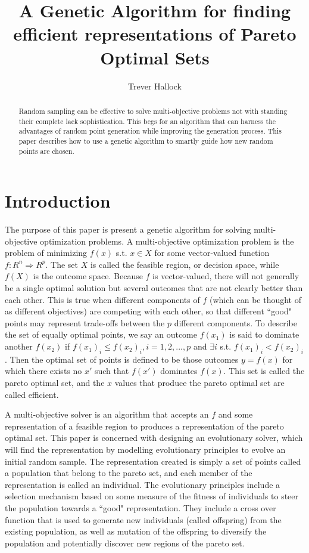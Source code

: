 \documentclass{article}
\author{Trever Hallock}
\title{A Genetic Algorithm for finding efficient representations of Pareto Optimal Sets}
\begin{document}
\maketitle


\begin{abstract}
Random sampling can be effective to solve multi-objective problems not with standing their complete lack sophistication.
This begs for an algorithm that can harness the advantages of random point generation while improving the generation process.
This paper describes how to use a genetic algorithm to smartly guide how new random points are chosen.
\end{abstract}

\pagebreak


\section{Introduction}

The purpose of this paper is present a genetic algorithm for solving multi-objective optimization problems.
A multi-objective optimization problem is the problem of minimizing $f(x)$ s.t. $x \in X$ for some vector-valued function $f:R^n \Rightarrow R^p$.
The set $X$ is called the feasible region, or decision space, while $f(X)$ is the outcome space.
Because $f$ is vector-valued, there will not generally be a single optimal solution but several outcomes that are not clearly better than each other.
This is true when different components of $f$ (which can be thought of as different objectives) are competing with each other, so that different ``good" points may represent trade-offs between the $p$ 
different components.
To describe the set of equally optimal points, we say an outcome $f(x_1)$ is said to dominate another $f(x_2)$ if $f(x_1)_i \le f(x_2)_i, i=1,2, ..., p$ and $\exists i$ s.t. $f(x_1)_i < f(x_2)_i$.
Then the optimal set of points is defined to be those outcomes $y = f(x)$ for which there exists no $x'$ such that $f(x')$ dominates $f(x)$.
This set is called the pareto optimal set, and the $x$ values that produce the pareto optimal set are called efficient.

A multi-objective solver is an algorithm that accepts an $f$ and some representation of a feasible region to produces a representation of the pareto optimal set.
This paper is concerned with designing an evolutionary solver, which will find the representation by modelling evolutionary principles to evolve an initial random sample.
The representation created is simply a set of points called a population that belong to the pareto set, and each member of the representation is called an individual.
The evolutionary principles include a selection mechanism based on some measure of the fitness of individuals to steer the population towards a ``good" representation.
They include a cross over function that is used to generate new individuals (called offspring) from the existing population, as well as mutation of the offspring
to diversify the population and potentially discover new regions of the pareto set.
\end{document}
